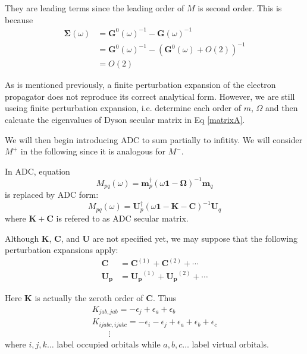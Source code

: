 They are leading terms since the leading order of $M$ is second order.
This is because
\begin{equation}
	\begin{aligned}
		\boldsymbol{\Sigma}(\omega)&=\boldsymbol{G}^{0}(\omega)^{-1}-\boldsymbol{G}(\omega)^{-1}
		\\
		&=\boldsymbol{G}^{0}(\omega)^{-1}-(\boldsymbol{G}^0(\omega)+O(2))^{-1}
		\\
		&=O(2)
	\end{aligned}
\end{equation}

As is mentioned previously, a finite perturbation expansion of the electron propagator does not reproduce its correct analytical form.
However, we are still useing finite perturbation expansion, i.e. determine each order of $m$, $\Omega$ and then calcuate the eigenvalues of Dyson secular matrix in Eq \ref{matrixA}.

We will then begin introducing ADC to sum partially to infitity.
We will consider $M^{+}$ in the following since it is analogous for $M^{-}$.

In ADC, equation 
\begin{equation}
	M_{p q}(\omega)=\boldsymbol{m}_{p}^{\dagger}(\omega \mathbf{1}-\boldsymbol{\Omega})^{-1} \boldsymbol{m}_{q}
\end{equation}
is replaced by ADC form:
\begin{equation}
	M_{p q}(\omega)=\boldsymbol{U}_{p}^{\dagger}(\omega \mathbf{1}-\boldsymbol{K}-\boldsymbol{C})^{-1} \boldsymbol{U}_{q}
\end{equation}
where
$\boldsymbol{K}+\boldsymbol{C}$ is refered to as ADC secular matrix.

Although $\boldsymbol{K}$, $\boldsymbol{C}$, and $\boldsymbol{U}$ are not specified yet,
we may suppose that the following perturbation expansions apply:
\begin{equation} \label{cuexpansion}
	\begin{aligned} 
		\boldsymbol{C} &=\boldsymbol{C}^{(1)}+\boldsymbol{C}^{(2)}+\cdots 
		\\ 
		\boldsymbol{U_{p}} &=\boldsymbol{U_{p}}^{(1)}+\boldsymbol{U_{p}}^{(2)}+\cdots
	\end{aligned}
\end{equation}

Here $\boldsymbol{K}$ is actually the zeroth order of $\boldsymbol{C}$.
Thus
\begin{equation}
	\begin{array}{l}{K_{j a b, j a b}=-\epsilon_{j}+\epsilon_{a}+\epsilon_{b}} \\ {K_{i j a b c, i j a b c}=-\epsilon_{i}-\epsilon_{j}+\epsilon_{a}+\epsilon_{b}+\epsilon_{c}} \\ {\qquad \vdots}\end{array}
\end{equation}
where $i, j, k \dots$ label occupied orbitals while $a, b, c \dots$ label virtual orbitals.

